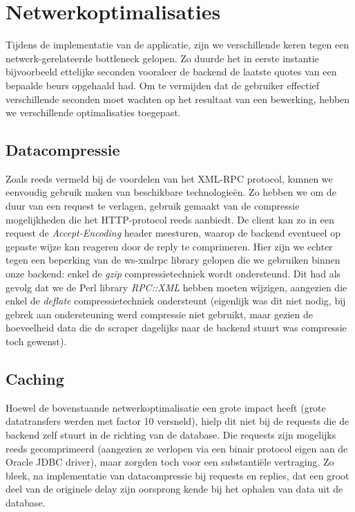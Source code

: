 %
%

\chapter{Netwerkoptimalisaties}

Tijdens de implementatie van de applicatie, zijn we verschillende keren tegen een netwerk-gerelateerde bottleneck gelopen. Zo duurde het in eerste instantie bijvoorbeeld ettelijke seconden vooraleer de backend de laatste quotes van een bepaalde beurs opgehaald had. Om te vermijden dat de gebruiker effectief verschillende seconden moet wachten op het resultaat van een bewerking, hebben we verschillende optimalisaties toegepast.


\section{Datacompressie}

Zoals reeds vermeld bij de voordelen van het XML-RPC protocol, kunnen we eenvoudig gebruik maken van beschikbare technologie\"en. Zo hebben we om de duur van een request te verlagen, gebruik gemaakt van de compressie mogelijkheden die het HTTP-protocol reeds aanbiedt. De client kan zo in een request de \emph{Accept-Encoding} header meesturen, waarop de backend eventueel op gepaste wijze kan reageren door de reply te comprimeren. Hier zijn we echter tegen een beperking van de ws-xmlrpc library gelopen die we gebruiken binnen onze backend: enkel de \emph{gzip} compressietechniek wordt ondersteund. Dit had als gevolg dat we de Perl library \emph{RPC::XML} hebben moeten wijzigen, aangezien die enkel de \emph{deflate} compressietechniek ondersteunt (eigenlijk was dit niet nodig, bij gebrek aan ondersteuning werd compressie niet gebruikt, maar gezien de hoeveelheid data die de scraper dagelijks naar de backend stuurt was compressie toch gewenst).


\section{Caching}

Hoewel de bovenstaande netwerkoptimalisatie een grote impact heeft (grote datatransfers werden met factor 10 versneld), hielp dit niet bij de requests die de backend zelf stuurt in de richting van de database. Die requests zijn mogelijks reeds gecomprimeerd (aangezien ze verlopen via een binair protocol eigen aan de Oracle JDBC driver), maar zorgden toch voor een substanti\"ele vertraging. Zo bleek, na implementatie van datacompressie bij requests en replies, dat een groot deel van de originele delay zijn oorsprong kende bij het ophalen van data uit de database.


